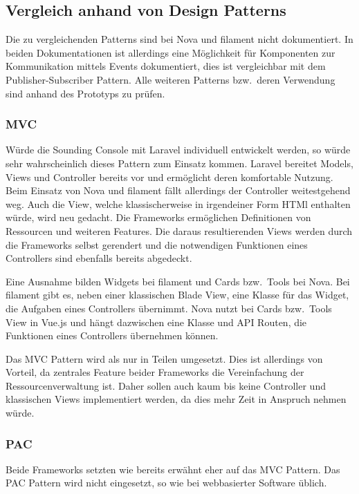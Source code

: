 \subsection{Vergleich anhand von Design Patterns}
Die zu vergleichenden Patterns sind bei Nova und filament nicht dokumentiert.
In beiden Dokumentationen ist allerdings eine Möglichkeit für Komponenten zur Kommunikation mittels Events dokumentiert, dies ist vergleichbar mit dem Publisher-Subscriber Pattern.
Alle weiteren Patterns bzw.\ deren Verwendung sind anhand des Prototyps zu prüfen.

\subsubsection{MVC}
Würde die Sounding Console mit Laravel individuell entwickelt werden, so würde sehr wahrscheinlich dieses Pattern zum Einsatz kommen.
Laravel bereitet Models, Views und Controller bereits vor und ermöglicht deren komfortable Nutzung.
Beim Einsatz von Nova und filament fällt allerdings der Controller weitestgehend weg.
Auch die View, welche klassischerweise in irgendeiner Form HTMl enthalten würde, wird neu gedacht.
Die Frameworks ermöglichen Definitionen von Ressourcen und weiteren Features.
Die daraus resultierenden Views werden durch die Frameworks selbst gerendert und die notwendigen Funktionen eines Controllers sind ebenfalls bereits abgedeckt.

Eine Ausnahme bilden Widgets bei filament und Cards bzw.\ Tools bei Nova.
Bei filament gibt es, neben einer klassischen Blade View, eine Klasse für das Widget, die Aufgaben eines Controllers übernimmt.
Nova nutzt bei Cards bzw.\ Tools View in Vue.js und hängt dazwischen eine Klasse und API Routen, die Funktionen eines Controllers übernehmen können.

Das MVC Pattern wird als nur in Teilen umgesetzt.
Dies ist allerdings von Vorteil, da zentrales Feature beider Frameworks die Vereinfachung der Ressourcenverwaltung ist.
Daher sollen auch kaum bis keine Controller und klassischen Views implementiert werden, da dies mehr Zeit in Anspruch nehmen würde.

\subsubsection{PAC}
Beide Frameworks setzten wie bereits erwähnt eher auf das MVC Pattern.
Das PAC Pattern wird nicht eingesetzt, so wie bei webbasierter Software üblich.

